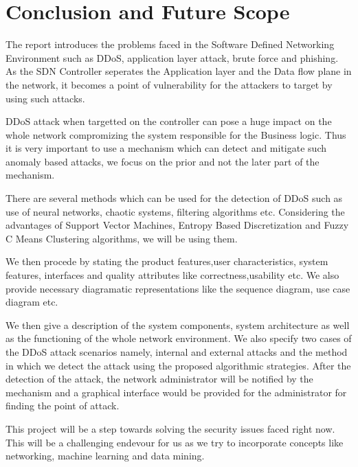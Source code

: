 \documentclass[12pt,a4paper,final]{report}
\begin{document}
\chapter{Conclusion and Future Scope}
\thispagestyle{empty}
\newpage
The report introduces the problems faced in the Software Defined Networking Environment such as DDoS,
application layer attack, brute force and phishing. As the SDN Controller seperates the Application layer and 
the Data flow plane in the network, it becomes a point of vulnerability for the attackers to target by using 
such attacks.

DDoS attack when targetted on the controller can pose a huge impact on the whole network compromizing the system 
responsible for the Business logic. Thus it is very important to use a mechanism which can detect and mitigate such 
anomaly based attacks, we focus on the prior and not the later part of the mechanism.

There are several methods which can be used for the detection of DDoS such as use of neural networks, chaotic 
systems, filtering algorithms etc. Considering the advantages of Support Vector Machines, Entropy Based Discretization and Fuzzy C Means Clustering algorithms, we will be using them.

We then procede by stating the product features,user characteristics, system features, interfaces and quality 
attributes like correctness,usability etc. We also provide necessary diagramatic representations like the 
sequence diagram, use case diagram etc.

We then give a description of the system components, system architecture as well as the functioning of the whole
network environment. We also specify two cases of the DDoS attack scenarios namely, internal and external attacks and the method in which we detect the attack using the proposed algorithmic strategies. After the detection of the attack, the network administrator will be notified by the mechanism and a graphical interface would be provided for the administrator for finding the point of attack.

This project will be a step towards solving the security issues faced right now. This will be a challenging endevour for us as we try to incorporate concepts like networking, machine learning and data mining.  
\newpage
\end{document}
